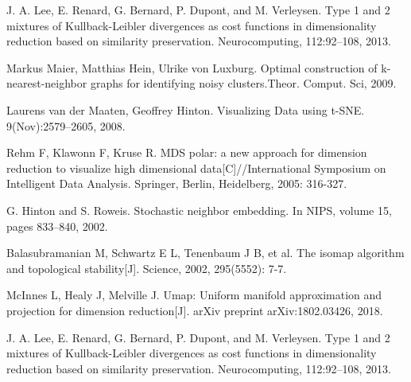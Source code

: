 \documentclass{EPL-master-thesis-covers-EN}
\begin{document}
\begin{thebibliography}{99}
J. A. Lee, E. Renard, G. Bernard, P. Dupont, and M. Verleysen. Type 1 and 2 mixtures of Kullback-Leibler divergences as cost functions in dimensionality reduction based on similarity preservation. Neurocomputing, 112:92–108, 2013.

Markus Maier, Matthias Hein, Ulrike von Luxburg. Optimal construction of k-nearest-neighbor graphs for identifying noisy clusters.Theor. Comput. Sci, 2009.

Laurens van der Maaten, Geoffrey Hinton. Visualizing Data using t-SNE. 9(Nov):2579--2605, 2008.

Rehm F, Klawonn F, Kruse R. MDS polar: a new approach for dimension reduction to visualize high dimensional data[C]//International Symposium on Intelligent Data Analysis. Springer, Berlin, Heidelberg, 2005: 316-327.

G. Hinton and S. Roweis. Stochastic neighbor embedding. In NIPS, volume 15, pages 833–840, 2002.

Balasubramanian M, Schwartz E L, Tenenbaum J B, et al. The isomap algorithm and topological stability[J]. Science, 2002, 295(5552): 7-7.

McInnes L, Healy J, Melville J. Umap: Uniform manifold approximation and projection for dimension reduction[J]. arXiv preprint arXiv:1802.03426, 2018.

J. A. Lee, E. Renard, G. Bernard, P. Dupont, and M. Verleysen. Type 1 and 2 mixtures of Kullback-Leibler divergences as cost functions in dimensionality reduction based on similarity preservation. Neurocomputing, 112:92–108, 2013.



\end{thebibliography}

  \backcoverpage
\end{document}
